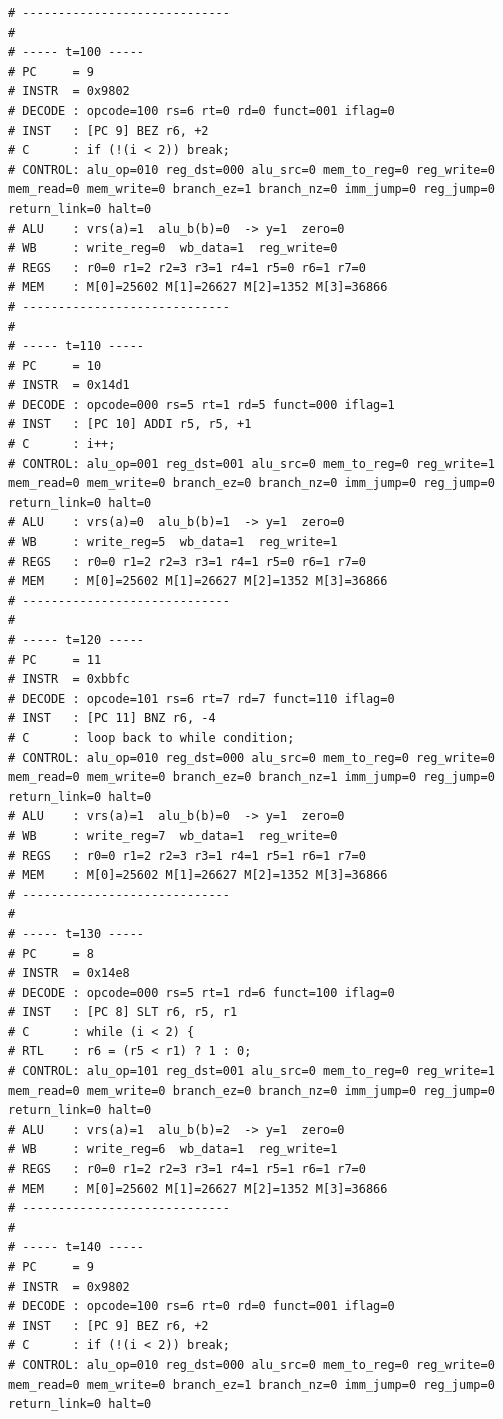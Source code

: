 \documentclass[12pt]{report}
\begin{document}
\begin{lstlisting}
# -----------------------------
# 
# ----- t=100 -----
# PC     = 9
# INSTR  = 0x9802
# DECODE : opcode=100 rs=6 rt=0 rd=0 funct=001 iflag=0
# INST   : [PC 9] BEZ r6, +2
# C      : if (!(i < 2)) break;
# CONTROL: alu_op=010 reg_dst=000 alu_src=0 mem_to_reg=0 reg_write=0 mem_read=0 mem_write=0 branch_ez=1 branch_nz=0 imm_jump=0 reg_jump=0 return_link=0 halt=0
# ALU    : vrs(a)=1  alu_b(b)=0  -> y=1  zero=0
# WB     : write_reg=0  wb_data=1  reg_write=0
# REGS   : r0=0 r1=2 r2=3 r3=1 r4=1 r5=0 r6=1 r7=0
# MEM    : M[0]=25602 M[1]=26627 M[2]=1352 M[3]=36866
# -----------------------------
# 
# ----- t=110 -----
# PC     = 10
# INSTR  = 0x14d1
# DECODE : opcode=000 rs=5 rt=1 rd=5 funct=000 iflag=1
# INST   : [PC 10] ADDI r5, r5, +1
# C      : i++;
# CONTROL: alu_op=001 reg_dst=001 alu_src=0 mem_to_reg=0 reg_write=1 mem_read=0 mem_write=0 branch_ez=0 branch_nz=0 imm_jump=0 reg_jump=0 return_link=0 halt=0
# ALU    : vrs(a)=0  alu_b(b)=1  -> y=1  zero=0
# WB     : write_reg=5  wb_data=1  reg_write=1
# REGS   : r0=0 r1=2 r2=3 r3=1 r4=1 r5=0 r6=1 r7=0
# MEM    : M[0]=25602 M[1]=26627 M[2]=1352 M[3]=36866
# -----------------------------
# 
# ----- t=120 -----
# PC     = 11
# INSTR  = 0xbbfc
# DECODE : opcode=101 rs=6 rt=7 rd=7 funct=110 iflag=0
# INST   : [PC 11] BNZ r6, -4
# C      : loop back to while condition;
# CONTROL: alu_op=010 reg_dst=000 alu_src=0 mem_to_reg=0 reg_write=0 mem_read=0 mem_write=0 branch_ez=0 branch_nz=1 imm_jump=0 reg_jump=0 return_link=0 halt=0
# ALU    : vrs(a)=1  alu_b(b)=0  -> y=1  zero=0
# WB     : write_reg=7  wb_data=1  reg_write=0
# REGS   : r0=0 r1=2 r2=3 r3=1 r4=1 r5=1 r6=1 r7=0
# MEM    : M[0]=25602 M[1]=26627 M[2]=1352 M[3]=36866
# -----------------------------
# 
# ----- t=130 -----
# PC     = 8
# INSTR  = 0x14e8
# DECODE : opcode=000 rs=5 rt=1 rd=6 funct=100 iflag=0
# INST   : [PC 8] SLT r6, r5, r1
# C      : while (i < 2) {
# RTL    : r6 = (r5 < r1) ? 1 : 0;
# CONTROL: alu_op=101 reg_dst=001 alu_src=0 mem_to_reg=0 reg_write=1 mem_read=0 mem_write=0 branch_ez=0 branch_nz=0 imm_jump=0 reg_jump=0 return_link=0 halt=0
# ALU    : vrs(a)=1  alu_b(b)=2  -> y=1  zero=0
# WB     : write_reg=6  wb_data=1  reg_write=1
# REGS   : r0=0 r1=2 r2=3 r3=1 r4=1 r5=1 r6=1 r7=0
# MEM    : M[0]=25602 M[1]=26627 M[2]=1352 M[3]=36866
# -----------------------------
# 
# ----- t=140 -----
# PC     = 9
# INSTR  = 0x9802
# DECODE : opcode=100 rs=6 rt=0 rd=0 funct=001 iflag=0
# INST   : [PC 9] BEZ r6, +2
# C      : if (!(i < 2)) break;
# CONTROL: alu_op=010 reg_dst=000 alu_src=0 mem_to_reg=0 reg_write=0 mem_read=0 mem_write=0 branch_ez=1 branch_nz=0 imm_jump=0 reg_jump=0 return_link=0 halt=0

\end{lstlisting}
\end{document}
